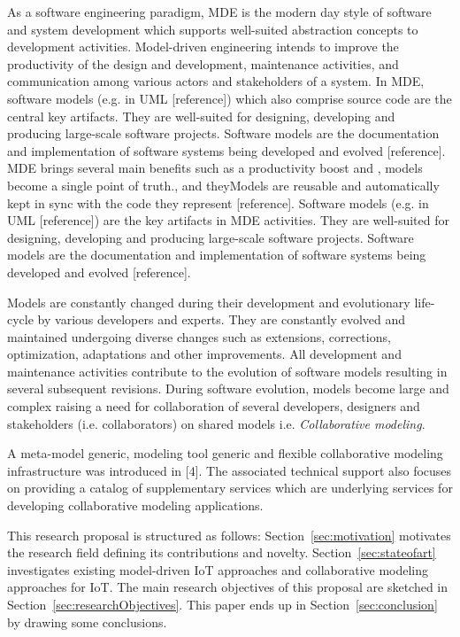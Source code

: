 As a software engineering paradigm, MDE is the modern day style of software and system development which supports well-suited abstraction concepts to development activities. Model-driven engineering intends to improve the productivity of the design and develop­ment, maintenance activities, and communication among various actors and stakeholders of a system. In MDE, software models (e.g. in UML [reference]) which also comprise source code are the central key artifacts. They are well-suited for designing, developing and producing large-scale software projects. Software models are the documentation and implementation of software systems being developed and evolved [reference]. MDE brings several main benefits such as a productivity boost and , models become a single point of truth., and theyModels are reusable and automatically kept in sync with the code they represent [reference]. Software models (e.g. in UML [reference]) are the key artifacts in MDE activities. They are well-suited for designing, developing and producing large-scale software projects. Software models are the documentation and implementation of software systems being developed and evolved [reference].

Models are constantly changed during their development and evolutionary life-cycle by various developers and experts. They are constantly evolved and maintained undergoing diverse changes such as extensions, corrections, optimization, adaptations and other improvements. All development and maintenance activities contribute to the evolution of software models resulting in several subsequent revisions. During software evolution, models become large and complex raising a need for collaboration of several developers, designers and stakeholders (i.e. collaborators) on shared models i.e. \textit{Collaborative modeling}.

A meta-model generic, modeling tool generic and flexible collaborative modeling infrastructure was introduced in [4]. The associated technical support also focuses on providing a catalog of supplementary services which are underlying services for developing collaborative modeling applications.

This research proposal is structured as follows: Section~\ref{sec:motivation} motivates the research field defining its contributions and novelty. Section~\ref{sec:stateofart} investigates existing model-driven IoT approaches and collaborative modeling approaches for IoT. The main research objectives of this proposal are sketched in Section~\ref{sec:researchObjectives}. This paper ends up in Section~\ref{sec:conclusion} by drawing some conclusions.